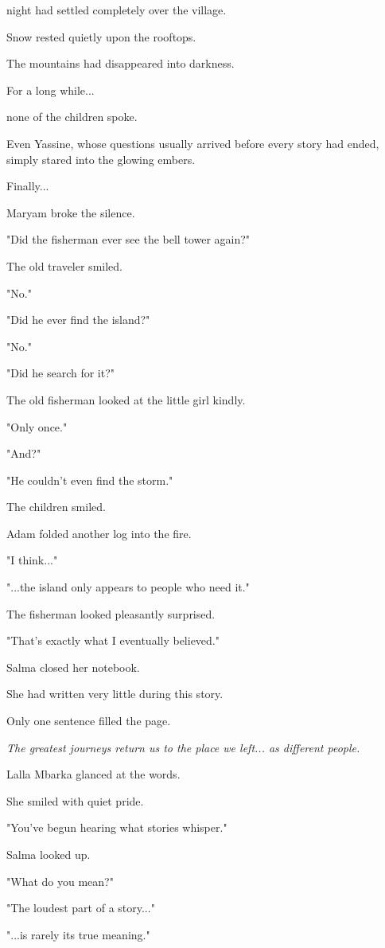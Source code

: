 \documentclass[12pt,openany]{book}
\begin{document}
night had settled completely over the village.

Snow rested quietly upon the rooftops.

The mountains had disappeared into darkness.

For a long while...

none of the children spoke.

Even Yassine, whose questions usually arrived before every story had ended, simply stared into the glowing embers.

Finally...

Maryam broke the silence.

"Did the fisherman ever see the bell tower again?"

The old traveler smiled.

"No."

"Did he ever find the island?"

"No."

"Did he search for it?"

The old fisherman looked at the little girl kindly.

"Only once."

"And?"

"He couldn't even find the storm."

The children smiled.

Adam folded another log into the fire.

"I think..."

"...the island only appears to people who need it."

The fisherman looked pleasantly surprised.

"That's exactly what I eventually believed."

Salma closed her notebook.

She had written very little during this story.

Only one sentence filled the page.

\emph{The greatest journeys return us to the place we left... as different people.}

Lalla Mbarka glanced at the words.

She smiled with quiet pride.

"You've begun hearing what stories whisper."

Salma looked up.

"What do you mean?"

"The loudest part of a story..."

"...is rarely its true meaning."
\end{document}
